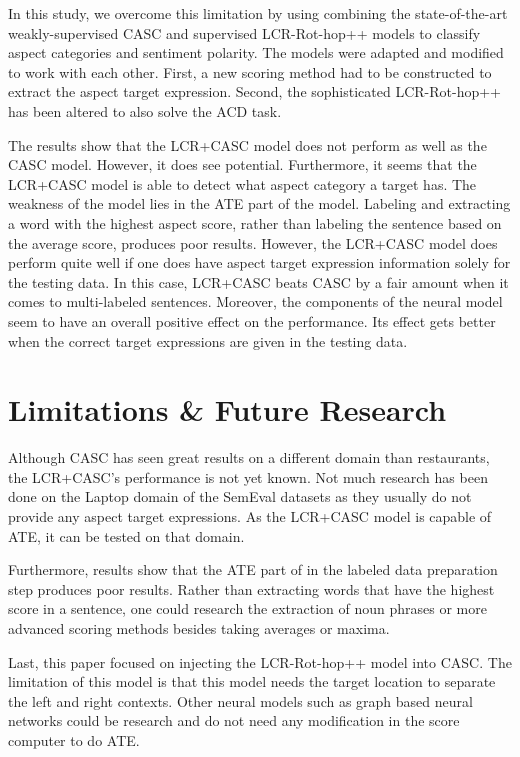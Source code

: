 \documentclass[american, oneside]{ecsgdp}
\begin{document}
In this study, we overcome this limitation by using combining the state-of-the-art weakly-supervised CASC \textcite{Kumar2021CASC} and supervised LCR-Rot-hop++ \textcite{Trusca2020HAABSA++} models to classify aspect categories and sentiment polarity. The models were adapted and modified to work with each other. First, a new scoring method had to be constructed to extract the aspect target expression. Second, the sophisticated LCR-Rot-hop++ has been altered to also solve the ACD task.

The results show that the LCR+CASC model does not perform as well as the CASC model. However, it does see potential. Furthermore, it seems that the LCR+CASC model is able to detect what aspect category a target has. The weakness of the model lies in the ATE part of the model. Labeling and extracting a word with the highest aspect score, rather than labeling the sentence based on the average score, produces poor results. However, the LCR+CASC model does perform quite well if one does have aspect target expression information solely for the testing data. In this case, LCR+CASC beats CASC by a fair amount when it comes to multi-labeled sentences. Moreover, the components of the neural model seem to have an overall positive effect on the performance. Its effect gets better when the correct target expressions are given in the testing data. 

\section{Limitations \& Future Research} \label{sec:limitation}
Although CASC has seen great results on a different domain than restaurants, the LCR+CASC's performance is not yet known. Not much research has been done on the Laptop domain of the SemEval datasets as they usually do not provide any aspect target expressions. As the LCR+CASC model is capable of ATE, it can be tested on that domain. 

Furthermore, results show that the ATE part of in the labeled data preparation step produces poor results. Rather than extracting words that have the highest score in a sentence, one could research the extraction of noun phrases or more advanced scoring methods besides taking averages or maxima.

Last, this paper focused on injecting the LCR-Rot-hop++ model into CASC. The limitation of this model is that this model needs the target location to separate the left and right contexts. Other neural models such as graph based neural networks could be research and do not need any modification in the score computer to do ATE.



\backmatter
\printbibliography
% 
% 

\appendix
\end{document}
